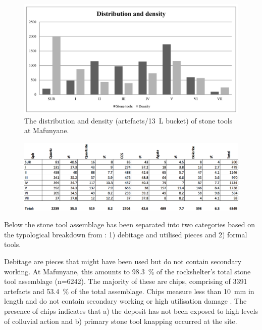 \documentclass{ijsra}
\begin{document}
	\begin{figure} %
		\includegraphics[width=\linewidth]{figures/Forssman-Figure04}
		\caption{The distribution and density (artefacts/\SI{13}{\liter} bucket) of stone tools at Mafunyane.}
		\label{fig:Forssman-Figure04}
	\end{figure}

	\begin{figure} %
		\includegraphics[width=\linewidth]{figures/Forssman-Table02}
		\label{fig:Forssman-Table02}
	\end{figure}

Below the stone tool assemblage has been separated into two categories based on the typological breakdown from \textcite{Walker_1994}: 1) debitage and utilised pieces and 2) formal tools.

Debitage are  pieces that might have been used but do not contain secondary working. 
At Mafunyane, this amounts to \SI{98.3}{\percent} of the rockshelter’s total stone tool assemblage (n=\num{6242}). 
The majority of these are chips, comprising of \num{3391} artefacts and \SI{53.4}{\percent} of the total assemblage. 
Chips measure less than \SI{10}{\milli\meter}
  in length and do not contain secondary working or high utilisation damage \parencite[see][]{Deacon_1984a}. 
 The presence of chips indicates that a) the deposit has not been exposed to high levels of colluvial action \parencite{Kuman_2009} and b) primary stone tool knapping occurred at the site.
\end{document}
